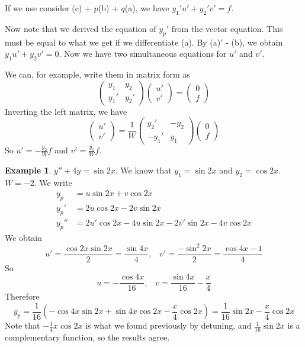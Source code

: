 \documentclass[a4paper]{article}
\theoremstyle{definition}
\newtheorem*{eg}{Example}
\begin{document}
If we use consider (c) + $p$(b) + $q$(a), we have $y_1' u' + y_2'v' = f$.

Now note that we derived the equation of $y_p'$ from the vector equation. This must be equal to what we get if we differentiate (a). By (a)$'$ - (b), we obtain $y_1u' + y_2v' = 0$. Now we have two simultaneous equations for $u'$ and $v'$.

We can, for example, write them in matrix form as
\[
\begin{pmatrix}
  y_1 & y_2\\
  y_1' & y_2'
\end{pmatrix}
\begin{pmatrix}
  u'\\
  v'
\end{pmatrix}
=
\begin{pmatrix}
  0\\
  f
\end{pmatrix}
\]
Inverting the left matrix, we have
\[
\begin{pmatrix}
  u'\\
  v'
\end{pmatrix} = \frac{1}{W}
\begin{pmatrix}
  y_2' & -y_2\\
  -y_1' & y_1
\end{pmatrix}
\begin{pmatrix}
  0\\f
\end{pmatrix}
\]
So $u' = -\frac{y_2}{W}f$ and $v' = \frac{y_1}{W}f$.

\begin{eg}
  $y'' + 4y = \sin 2x$. We know that $y_1 = \sin 2x$ and $y_2 = \cos 2x$. $W = -2$. We write
\begin{align*}
  y_p &= u\sin 2x + v\cos 2x\\
  y_p' &= 2u\cos 2x - 2v\sin 2x\\
  y_p'' &= 2u'\cos 2x - 4u\sin 2x - 2v' \sin 2x - 4v\cos 2x
\end{align*}
We obtain 
\[
u' = \frac{\cos 2x\sin 2x}{2} = \frac{\sin 4x}{4},\;\;\; v' = \frac{-\sin^2 2x}{2} = \frac{\cos 4x - 1}{4}
\]
So 
\[
u = -\frac{\cos 4x}{16}, \;\;\; v = \frac{\sin 4x}{16} - \frac{x}{4}
\]
Therefore
\[
y_p = \frac{1}{16}(-\cos 4x\sin 2x + \sin 4x\cos 2x - \frac{x}{4}\cos 2x) = \frac{1}{16}\sin 2x - \frac{x}{4}\cos 2x
\]
Note that $-\frac{1}{4}x\cos 2x$ is what we found previously by detuning, and $\frac{1}{16}\sin 2x$ is a complementary function, so the results agree.
\end{eg}
\end{document}

